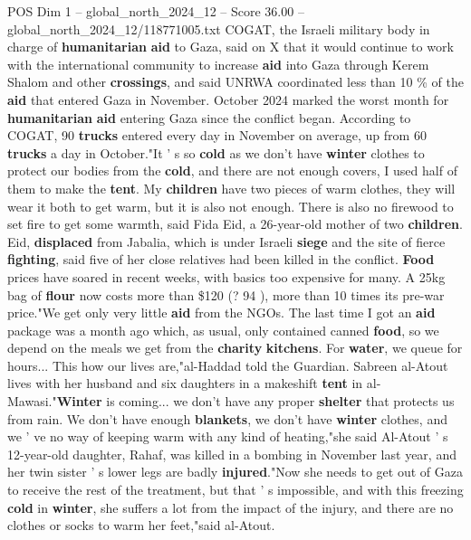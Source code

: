 \begin{textsample}{POS Dim 1 – global\_north\_2024\_12 – Score 36.00 – global\_north\_2024\_12/118771005.txt}
COGAT, the Israeli military body in charge of \textbf{humanitarian} \textbf{aid} to Gaza, said on X that it would continue to work with the international community to increase \textbf{aid} into Gaza through Kerem Shalom and other \textbf{crossings}, and said UNRWA coordinated less than 10 \% of the \textbf{aid} that entered Gaza in November.
October 2024 marked the worst month for \textbf{humanitarian} \textbf{aid} entering Gaza since the conflict began.
According to COGAT, 90 \textbf{trucks} entered every day in November on average, up from 60 \textbf{trucks} a day in October."It ' s so \textbf{cold} as we don't have \textbf{winter} clothes to protect our bodies from the \textbf{cold}, and there are not enough covers, I used half of them to make the \textbf{tent}.
My \textbf{children} have two pieces of warm clothes, they will wear it both to get warm, but it is also not enough.
There is also no firewood to set fire to get some warmth, said Fida Eid, a 26-year-old mother of two \textbf{children}.
Eid, \textbf{displaced} from Jabalia, which is under Israeli \textbf{siege} and the site of fierce \textbf{fighting}, said five of her close relatives had been killed in the conflict. \textbf{Food} prices have soared in recent weeks, with basics too expensive for many.
A 25kg bag of \textbf{flour} now costs more than \$120 (? 94 ), more than 10 times its pre-war price."We get only very little \textbf{aid} from the NGOs.
The last time I got an \textbf{aid} package was a month ago which, as usual, only contained canned \textbf{food}, so we depend on the meals we get from the \textbf{charity} \textbf{kitchens}.
For \textbf{water}, we queue for hours...
This how our lives are,"al-Haddad told the Guardian.
Sabreen al-Atout lives with her husband and six daughters in a makeshift \textbf{tent} in al-Mawasi."\textbf{Winter} is coming... we don't have any proper \textbf{shelter} that protects us from rain.
We don't have enough \textbf{blankets}, we don't have \textbf{winter} clothes, and we ' ve no way of keeping warm with any kind of heating,"she said Al-Atout ' s 12-year-old daughter, Rahaf, was killed in a bombing in November last year, and her twin sister ' s lower legs are badly \textbf{injured}."Now she needs to get out of Gaza to receive the rest of the treatment, but that ' s impossible, and with this freezing \textbf{cold} in \textbf{winter}, she suffers a lot from the impact of the injury, and there are no clothes or socks to warm her feet,"said al-Atout.

\end{textsample}
